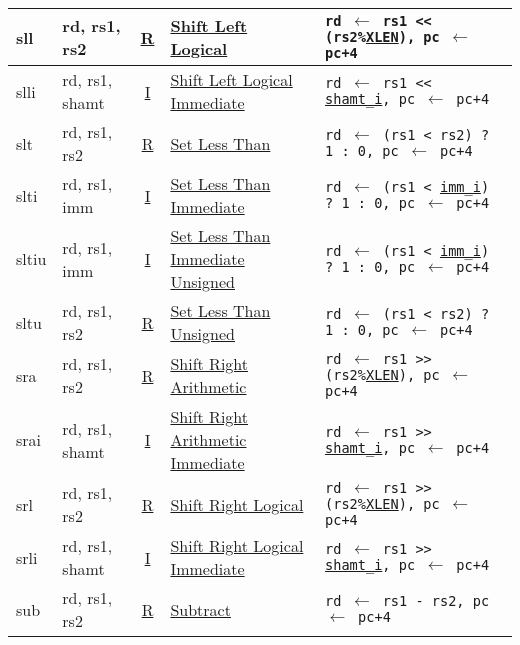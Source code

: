 {\begin{tabular}{|ll|c|l|l|}
\hline
sll   & rd, rs1, rs2   & \hyperref[insnformat:rtype]{R} & \hyperref[insn:sll]{Shift Left Logical}        & {\tt rd $\leftarrow$ rs1 << (rs2\%\hyperref[XLEN]{XLEN}), pc $\leftarrow$ pc+4}\\
\hline
slli  & rd, rs1, shamt & \hyperref[insnformat:itype]{I} & \hyperref[insn:slli]{Shift Left Logical Immediate} & {\tt rd $\leftarrow$ rs1 << \hyperref[shamt.i:decode]{shamt\_i}, pc $\leftarrow$ pc+4}\\
\hline
slt   & rd, rs1, rs2   & \hyperref[insnformat:rtype]{R} & \hyperref[insn:slt]{Set Less Than}             & {\tt rd $\leftarrow$ (rs1 < rs2) ? 1 : 0, pc $\leftarrow$ pc+4}\\
\hline
slti  & rd, rs1, imm  & \hyperref[insnformat:itype]{I} & \hyperref[insn:slti]{Set Less Than Immediate}   & {\tt rd $\leftarrow$ (rs1 < \hyperref[imm.i:decode]{imm\_i}) ? 1 : 0, pc $\leftarrow$ pc+4}\\
\hline
sltiu & rd, rs1, imm  & \hyperref[insnformat:itype]{I} & \hyperref[insn:sltiu]{Set Less Than Immediate Unsigned} & {\tt rd $\leftarrow$ (rs1 < \hyperref[imm.i:decode]{imm\_i}) ? 1 : 0, pc $\leftarrow$ pc+4}\\
\hline
sltu  & rd, rs1, rs2   & \hyperref[insnformat:rtype]{R} & \hyperref[insn:sltu]{Set Less Than Unsigned}   & {\tt rd $\leftarrow$ (rs1 < rs2) ? 1 : 0, pc $\leftarrow$ pc+4}\\
\hline
sra   & rd, rs1, rs2   & \hyperref[insnformat:rtype]{R} & \hyperref[insn:sra]{Shift Right Arithmetic}    & {\tt rd $\leftarrow$ rs1 >> (rs2\%\hyperref[XLEN]{XLEN}), pc $\leftarrow$ pc+4}\\
\hline
srai  & rd, rs1, shamt & \hyperref[insnformat:itype]{I} & \hyperref[insn:srai]{Shift Right Arithmetic Immediate} & {\tt rd $\leftarrow$ rs1 >> \hyperref[shamt.i:decode]{shamt\_i}, pc $\leftarrow$ pc+4}\\
\hline
srl   & rd, rs1, rs2   & \hyperref[insnformat:rtype]{R} & \hyperref[insn:srl]{Shift Right Logical}       & {\tt rd $\leftarrow$ rs1 >> (rs2\%\hyperref[XLEN]{XLEN}), pc $\leftarrow$ pc+4}\\
\hline
srli  & rd, rs1, shamt & \hyperref[insnformat:itype]{I} & \hyperref[insn:srli]{Shift Right Logical Immediate} & {\tt rd $\leftarrow$ rs1 >> \hyperref[shamt.i:decode]{shamt\_i}, pc $\leftarrow$ pc+4}\\
\hline
sub   & rd, rs1, rs2   & \hyperref[insnformat:rtype]{R} & \hyperref[insn:sub]{Subtract}                  & {\tt rd $\leftarrow$ rs1 - rs2, pc $\leftarrow$ pc+4}\\

\end{tabular}}
